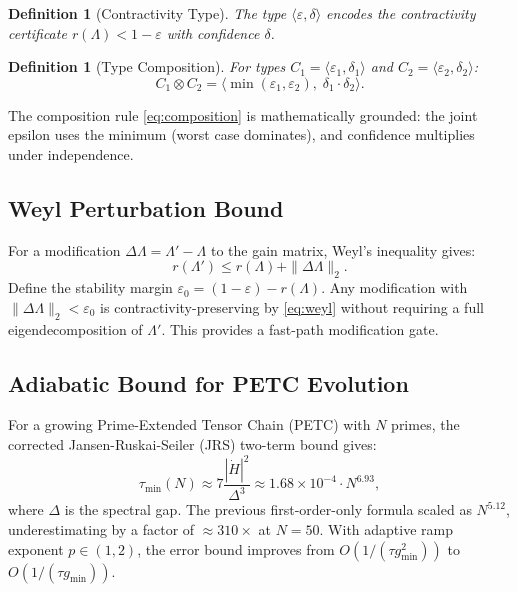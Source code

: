 \documentclass[11pt,letterpaper]{article}
\newtheorem{definition}[theorem]{Definition}
\theoremstyle{remark}
\begin{document}
\begin{definition}[Contractivity Type]
\label{def:ctype}
The type $\langle\varepsilon, \delta\rangle$ encodes the contractivity
certificate $r(\Lambda) < 1 - \varepsilon$ with confidence $\delta$.
\end{definition}

\begin{definition}[Type Composition]
\label{def:composition}
For types $C_1 = \langle\varepsilon_1, \delta_1\rangle$ and
$C_2 = \langle\varepsilon_2, \delta_2\rangle$:
\begin{equation}
  C_1 \otimes C_2 = \langle \min(\varepsilon_1, \varepsilon_2),\; \delta_1 \cdot \delta_2 \rangle.
  \label{eq:composition}
\end{equation}
\end{definition}

\noindent The composition rule \eqref{eq:composition} is mathematically
grounded: the joint epsilon uses the minimum (worst case dominates),
and confidence multiplies under independence.

\subsection{Weyl Perturbation Bound}

For a modification $\Delta\Lambda = \Lambda' - \Lambda$ to the gain
matrix, Weyl's inequality gives:
\begin{equation}
  r(\Lambda') \leq r(\Lambda) + \|\Delta\Lambda\|_2.
  \label{eq:weyl}
\end{equation}
Define the stability margin $\varepsilon_0 = (1 - \varepsilon) - r(\Lambda)$.
Any modification with $\|\Delta\Lambda\|_2 < \varepsilon_0$ is
contractivity-preserving by \eqref{eq:weyl} without requiring a full
eigendecomposition of $\Lambda'$. This provides a fast-path modification
gate.

\subsection{Adiabatic Bound for PETC Evolution}

For a growing Prime-Extended Tensor Chain (PETC) with $N$ primes,
the corrected Jansen-Ruskai-Seiler (JRS) two-term bound gives:
\begin{equation}
  \tau_{\min}(N) \approx 7\frac{|\dot{H}|^2}{\Delta^3} \approx 1.68 \times 10^{-4} \cdot N^{6.93},
  \label{eq:adiabatic}
\end{equation}
where $\Delta$ is the spectral gap. The previous first-order-only formula
scaled as $N^{5.12}$, underestimating by a factor of $\approx 310\times$
at $N = 50$. With adaptive ramp exponent $p \in (1,2)$, the error bound
improves from $O(1/(\tau g_{\min}^2))$ to $O(1/(\tau g_{\min}))$.
\end{document}
